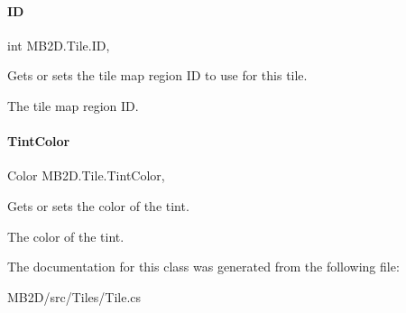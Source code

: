 \paragraph{\texorpdfstring{ID}{ID}}
{\footnotesize\ttfamily int M\+B2\+D.\+Tile.\+ID\hspace{0.3cm}{\ttfamily [get]}, {}}



Gets or sets the tile map region ID to use for this tile. 

The tile map region ID.\hypertarget{class_m_b2_d_1_1_tile_aec3aa2408ecc89cc40095f22b907eaa5}{}\label{class_m_b2_d_1_1_tile_aec3aa2408ecc89cc40095f22b907eaa5} 
\paragraph{\texorpdfstring{Tint\+Color}{TintColor}}
{\footnotesize\ttfamily Color M\+B2\+D.\+Tile.\+Tint\+Color\hspace{0.3cm}{\ttfamily [get]}, {}}



Gets or sets the color of the tint. 

The color of the tint.

The documentation for this class was generated from the following file\+:\begin{DoxyCompactItemize}
\item 
M\+B2\+D/src/\+Tiles/Tile.\+cs\end{DoxyCompactItemize}
